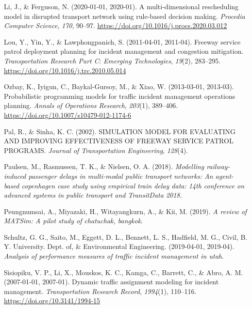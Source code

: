 \documentclass[fancy, oneside, mastersfancy, ms]{byuthesis}
\newlength{\cslhangindent}
\newlength{\cslentryspacingunit} %
\newenvironment{CSLReferences}[2] %
 {%
  \setlength{\parindent}{0pt}
  \ifodd #1
  \let\oldpar\par
  \def\par{\hangindent=\cslhangindent\oldpar}
  \fi
  \setlength{\parskip}{#2\cslentryspacingunit}
 }%
 {}
\begin{document}
\begin{CSLReferences}{1}{0}
\leavevmode{}%
Li, J., \& Ferguson, N. (2020-01-01, 2020-01). A multi-dimensional
rescheduling model in disrupted transport network using rule-based
decision making. \emph{Procedia Computer Science}, \emph{170}, 90--97.
\url{https://doi.org/10.1016/j.procs.2020.03.012}

\leavevmode{}%
Lou, Y., Yin, Y., \& Lawphongpanich, S. (2011-04-01, 2011-04). Freeway
service patrol deployment planning for incident management and
congestion mitigation. \emph{Transportation Research Part C: Emerging
Technologies}, \emph{19}(2), 283--295.
\url{https://doi.org/10.1016/j.trc.2010.05.014}

\leavevmode{}%
Ozbay, K., Iyigun, C., Baykal-Gursoy, M., \& Xiao, W. (2013-03-01,
2013-03). Probabilistic programming models for traffic incident
management operations planning. \emph{Annals of Operations Research},
\emph{203}(1), 389--406. \url{https://doi.org/10.1007/s10479-012-1174-6}

\leavevmode{}%
Pal, R., \& Sinha, K. C. (2002). {SIMULATION MODEL FOR EVALUATING AND
IMPROVING EFFECTIVENESS OF FREEWAY SERVICE PATROL PROGRAMS}.
\emph{Journal of Transportation Engineering}, \emph{128}(4).

\leavevmode{}%
Paulsen, M., Rasmussen, T. K., \& Nielsen, O. A. (2018). \emph{Modelling
railway-induced passenger delays in multi-modal public transport
networks: {An} agent-based copenhagen case study using empirical train
delay data: 14th conference on advanced systems in public transport and
{TransitData} 2018}.

\leavevmode{}%
Peungnumsai, A., Miyazaki, H., Witayangkurn, A., \& Kii, M. (2019).
\emph{A review of {MATSim}: {A} pilot study of chatuchak, bangkok}.

\leavevmode{}%
Schultz, G. G., Saito, M., Eggett, D. L., Bennett, L. S., Hadfield, M.
G., Civil, B. Y. University. Dept. of, \& Environmental Engineering.
(2019-04-01, 2019-04). \emph{Analysis of performance measures of traffic
incident management in utah}.

\leavevmode{}%
Sisiopiku, V. P., Li, X., Mouskos, K. C., Kamga, C., Barrett, C., \&
Abro, A. M. (2007-01-01, 2007-01). Dynamic traffic assignment modeling
for incident management. \emph{Transportation Research Record},
\emph{1994}(1), 110--116. \url{https://doi.org/10.3141/1994-15}


\end{CSLReferences}
\end{document}
